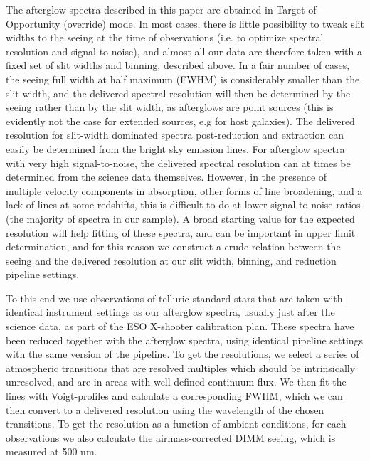\documentclass{aa}    %
\begin{document}
The afterglow spectra described in this paper are obtained in
Target-of-Opportunity (override) mode. In most cases, there is little
possibility to tweak slit widths to the seeing at the time of observations (i.e.
to optimize spectral resolution and signal-to-noise), and almost all our data are
therefore taken with a fixed set of slit widths and binning, described above. In
a fair number of cases, the seeing full width at half maximum (FWHM) is
considerably smaller than the slit width, and the delivered spectral resolution
will then be determined by the seeing rather than by the slit width, as afterglows are
point sources (this is evidently not the case for extended sources, e.g for host
galaxies). The delivered resolution for slit-width dominated spectra
post-reduction and extraction can easily be determined from the bright sky
emission lines. For afterglow spectra with very high signal-to-noise, the
delivered spectral resolution can at times be determined from the science data
themselves. However, in the presence of multiple velocity components in
absorption, other forms of line broadening, and a lack of lines at some
redshifts, this is difficult to do at lower signal-to-noise ratios (the
majority of spectra in our sample). A broad starting value for the expected
resolution will help fitting of these spectra, and can be important in upper
limit determination, and for this reason we construct a crude relation between
the seeing and the delivered resolution at our slit width, binning, and
reduction pipeline settings. 

To this end we use observations of telluric standard stars that are taken with
identical instrument settings as our afterglow spectra, usually just after the
science data, as part of the ESO X-shooter calibration plan. These spectra have
been reduced together with the afterglow spectra, using identical pipeline
settings with the same version of the pipeline. To get the resolutions, we
select a series of atmospheric transitions that are resolved multiples which
should be intrinsically unresolved, and are in areas with well defined continuum
flux. We then fit the lines with Voigt-profiles and calculate a corresponding
FWHM, which we can then convert to a delivered resolution using the wavelength
of the chosen transitions. To get the resolution as a function of ambient
conditions, for each observations we also calculate the airmass-corrected
\href{http://www.eso.org/asm/ui/publicLog}{DIMM} seeing, which is measured at
500 nm.
\end{document}
